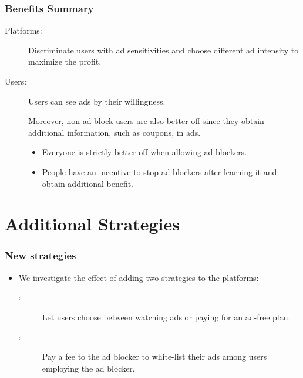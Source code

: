 \documentclass{beamer}
\newcommand{\hl}[1]{\textcolor{myblue}{#1}}
\newcommand{\aof}{\textch{\textcolor{myblue}{Ads or Fee}}}
\newcommand{\wl}{\textch{\textcolor{myblue}{White-List}}}
\begin{document}
\begin{frame}
    \frametitle{Benefits Summary}
    \begin{description}
        \item[Platforms:]
            Discriminate users with ad sensitivities and choose different
            ad intensity to maximize the profit.
        \item[Users:]
            Users can see ads by their willingness.

            Moreover, non-ad-block users are also better off since they obtain
            additional information, such as coupons, in ads.
            \begin{itemize}
                \item \hl{Everyone is strictly better off when allowing ad blockers.}
                \item People have an incentive to stop ad blockers after learning it
                    and obtain additional benefit.
            \end{itemize}
    \end{description}
\end{frame}

\section{Additional Strategies}
\begin{frame}
    \frametitle{New strategies}
    \begin{itemize}
        \item We investigate the effect of adding two strategies to
            the \hl{platforms}:
            \begin{description}
                \item[\aof:] Let users choose between watching ads
                    or paying for an ad-free plan.
                \item[\wl:] \hl{Pay a fee to the ad blocker 
                    to white-list their ads} among users employing the ad blocker.
            \end{description}
    \end{itemize}
\end{frame}
\end{document}

